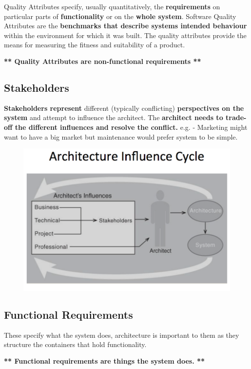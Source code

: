 \documentclass[a4paper]{article}
\begin{document}
Quality Attributes specify, usually quantitatively, the \textbf{requirements} on particular parts of \textbf{functionality} or on the \textbf{whole system}. Software Quality Attributes are the \textbf{benchmarks that describe systems intended behaviour} within the environment for which it was built. The quality attributes provide the means for measuring the fitness and suitability of a product.

\textbf{** Quality Attributes are non-functional requirements **}

\subsection{Stakeholders}
\textbf{Stakeholders represent} different (typically conflicting) \textbf{perspectives on the system} and attempt to influence the architect. The \textbf{architect needs to trade-off the different influences and resolve the conflict.} e.g. - Marketing might want to have a big market but maintenance would prefer system to be simple.

\begin{figure}[h]
\centering 
\includegraphics[scale=0.3]{images/influencecycle.png}
\end{figure}

\subsection{Functional Requirements}
These specify what the system does, architecture is important to them as they structure the containers that hold functionality. 

\textbf{** Functional requirements are things the system does. **}
\end{document}
